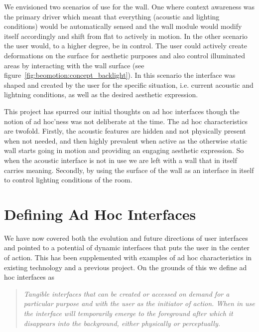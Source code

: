 We envisioned two scenarios of use for the wall.
One where context awareness was the primary driver which meant that everything (acoustic and lighting conditions) would be automatically sensed and the wall module would modify itself accordingly and shift from flat to actively in motion.
In the other scenario the user would, to a higher degree, be in control.
The user could actively create deformations on the surface for aesthetic purposes and also control illuminated areas by interacting with the wall surface (see figure~\ref{fig:beomotion:concept_backlight}).
In this scenario the interface was shaped and created by the user for the specific situation, i.e. current acoustic and lightning conditions, as well as the desired aesthetic expression. 

This project has spurred our initial thoughts on ad hoc interfaces though the notion of ad hoc'ness was not deliberate at the time.
The ad hoc characteristics are twofold.
Firstly, the acoustic features are hidden and not physically present when not needed, and then highly prevalent when active as the otherwise static wall starts going in motion and providing an engaging aesthetic expression.
So when the acoustic interface is not in use we are left with a wall that in itself carries meaning.
Secondly, by using the surface of the wall as an interface in itself to control lighting conditions of the room. 


\section{Defining Ad Hoc Interfaces} 
\label{ch:adhoc:defining-ahi}
We have now covered both the evolution and future directions of user interfaces and pointed to a potential of dynamic interfaces that puts the user in the center of action.
This has been supplemented with examples of ad hoc characteristics in existing technology and a previous project.
On the grounds of this we define ad hoc interfaces as 

\begin{quotation}\label{adhoc:definition}
\emph{Tangible interfaces that can be created or accessed on demand for a particular purpose and with the user as the initiator of action. When in use the interface will temporarily emerge to the foreground after which it disappears into the background, either physically or perceptually.}
\end{quotation}

